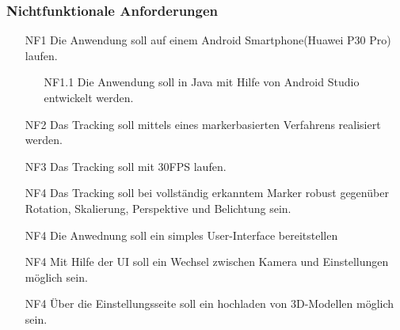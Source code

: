 \subsubsection{Nichtfunktionale Anforderungen}
\begin{itemize}
\item[NF1] Die Anwendung soll auf einem Android Smartphone(Huawei P30 Pro) laufen.
\begin{enumerate}
\item[NF1.1] Die Anwendung soll in Java mit Hilfe von Android Studio entwickelt werden.
\end{enumerate}

\item[NF2] Das Tracking soll mittels eines markerbasierten Verfahrens realisiert werden.
\item[NF3] Das Tracking soll mit 30FPS laufen.
\item[NF4] Das Tracking soll bei vollständig erkanntem Marker robust gegenüber Rotation, Skalierung, Perspektive und Belichtung sein.
\item[NF4] Die Anwednung soll ein simples User-Interface bereitstellen
\item[NF4] Mit Hilfe der UI soll ein Wechsel zwischen Kamera und Einstellungen möglich sein.
\item[NF4] Über die Einstellungsseite soll ein hochladen von 3D-Modellen möglich sein.

\end{itemize}

